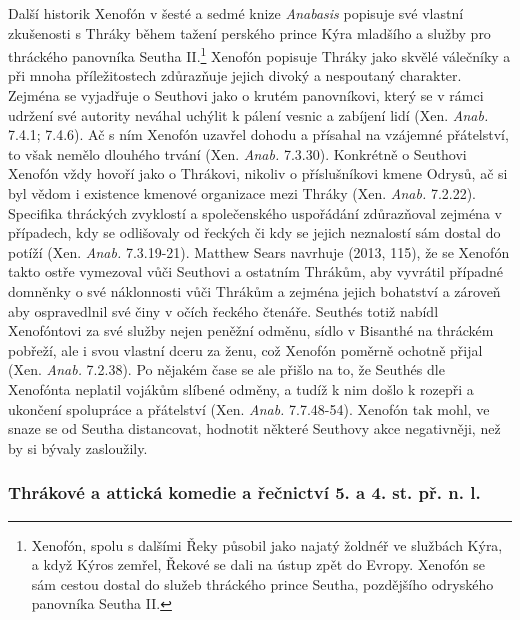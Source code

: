 Další historik Xenofón v šesté a sedmé knize {\em Anabasis} popisuje své vlastní zkušenosti s Thráky během tažení perského prince Kýra mladšího a služby pro thráckého panovníka Seutha II.\footnote{Xenofón, spolu s dalšími Řeky působil jako najatý žoldnéř ve službách Kýra, a když Kýros zemřel, Řekové se dali na ústup zpět do Evropy. Xenofón se sám cestou dostal do služeb thráckého prince Seutha, pozdějšího odryského panovníka Seutha II.} Xenofón popisuje Thráky jako skvělé válečníky a při mnoha příležitostech zdůrazňuje jejich divoký a nespoutaný charakter. Zejména se vyjadřuje o Seuthovi jako o krutém panovníkovi, který se v rámci udržení své autority neváhal uchýlit k pálení vesnic a zabíjení lidí (Xen. {\em Anab.} 7.4.1; 7.4.6). Ač s ním Xenofón uzavřel dohodu a přísahal na vzájemné přátelství, to však nemělo dlouhého trvání (Xen. {\em Anab.} 7.3.30). Konkrétně o Seuthovi Xenofón vždy hovoří jako o Thrákovi, nikoliv o příslušníkovi kmene Odrysů, ač si byl vědom i existence kmenové organizace mezi Thráky (Xen. {\em Anab.} 7.2.22). Specifika thráckých zvyklostí a společenského uspořádání zdůrazňoval zejména v případech, kdy se odlišovaly od řeckých či kdy se jejich neznalostí sám dostal do potíží (Xen. {\em Anab.} 7.3.19-21). Matthew Sears navrhuje (2013, 115), že se Xenofón takto ostře vymezoval vůči Seuthovi a ostatním Thrákům, aby vyvrátil případné domněnky o své náklonnosti vůči Thrákům a zejména jejich bohatství a zároveň aby ospravedlnil své činy v očích řeckého čtenáře. Seuthés totiž nabídl Xenofóntovi za své služby nejen peněžní odměnu, sídlo v Bisanthé na thráckém pobřeží, ale i svou vlastní dceru za ženu, což Xenofón poměrně ochotně přijal (Xen. {\em Anab.} 7.2.38). Po nějakém čase se ale přišlo na to, že Seuthés dle Xenofónta neplatil vojákům slíbené odměny, a tudíž k nim došlo k rozepři a ukončení spolupráce a přátelství (Xen. {\em Anab.} 7.7.48-54). Xenofón tak mohl, ve snaze se od Seutha distancovat, hodnotit některé Seuthovy akce negativněji, než by si bývaly zasloužily.

\subsubsection[thrákové-a-attická-komedie-a-řečnictví-5.-a-4.-st.-př.-n.-l.]{Thrákové a attická komedie a řečnictví 5. a 4. st. př. n. l.}


